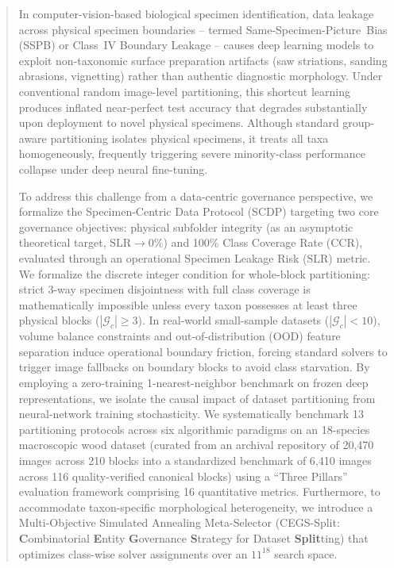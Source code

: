 \documentclass[a4paper,fleqn]{cas-sc}
\begin{document}
\begin{abstract}
In computer-vision-based biological specimen identification, data leakage across physical specimen boundaries -- termed \mbox{Same-Specimen-Picture Bias} (SSPB) or Class~IV Boundary Leakage -- causes deep learning models to exploit non-taxonomic surface preparation artifacts (saw striations, sanding abrasions, vignetting) rather than authentic diagnostic morphology. Under conventional random image-level partitioning, this shortcut learning produces inflated near-perfect test accuracy that degrades substantially upon deployment to novel physical specimens. Although standard group-aware partitioning isolates physical specimens, it treats all taxa homogeneously, frequently triggering severe minority-class performance collapse under deep neural fine-tuning.

To address this challenge from a data-centric governance perspective, we formalize the Specimen-Centric Data Protocol (SCDP) targeting two core governance objectives: physical subfolder integrity (as an asymptotic theoretical target, $\mathrm{SLR} \to 0\%$) and 100\% Class Coverage Rate ($\mathrm{CCR}$), evaluated through an operational Specimen Leakage Risk ($\mathrm{SLR}$) metric. We formalize the discrete integer condition for whole-block partitioning: strict 3-way specimen disjointness with full class coverage is mathematically impossible unless every taxon possesses at least three physical blocks ($|\mathcal{G}_c| \ge 3$). In real-world small-sample datasets ($|\mathcal{G}_c| < 10$), volume balance constraints and out-of-distribution (OOD) feature separation induce operational boundary friction, forcing standard solvers to trigger image fallbacks on boundary blocks to avoid class starvation. By employing a zero-training 1-nearest-neighbor benchmark on frozen deep representations, we isolate the causal impact of dataset partitioning from neural-network training stochasticity. We systematically benchmark 13 partitioning protocols across six algorithmic paradigms on an 18-species macroscopic wood dataset (curated from an archival repository of 20,470 images across 210 blocks into a standardized benchmark of 6,410 images across 116 quality-verified canonical blocks) using a ``Three Pillars'' evaluation framework comprising 16 quantitative metrics. Furthermore, to accommodate taxon-specific morphological heterogeneity, we introduce a Multi-Objective Simulated Annealing Meta-Selector (CEGS-Split: \textbf{C}ombinatorial \textbf{E}ntity \textbf{G}overnance \textbf{S}trategy for Dataset \textbf{Split}ting) that optimizes class-wise solver assignments over an $11^{18}$ search space.


\end{abstract}
\end{document}
